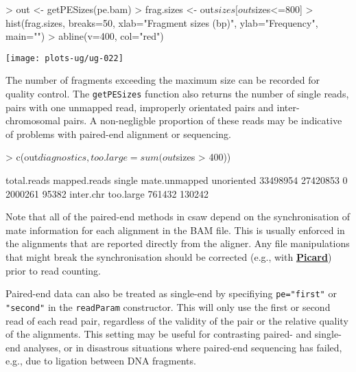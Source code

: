 \documentclass[12pt]{report}
\renewenvironment{Schunk}{\vspace{0pt}}{\vspace{0pt}}
\newcommand{\pkgname}{csaw}
\newcommand{\code}[1]{{\small\texttt{#1}}}
\begin{document}
\begin{Schunk}
\begin{Sinput}
> out <- getPESizes(pe.bam)
> frag.sizes <- out$sizes[out$sizes<=800]
> hist(frag.sizes, breaks=50, xlab="Fragment sizes (bp)", ylab="Frequency", main="")
> abline(v=400, col="red")
\end{Sinput}
\end{Schunk}

\begin{center}
\texttt{[image: plots-ug/ug-022]}
\end{center}

The number of fragments exceeding the maximum size can be recorded for quality control. 
The \code{getPESizes} function also returns the number of single reads, pairs with one unmapped read, improperly orientated pairs and inter-chromosomal pairs.
A non-negligble proportion of these reads may be indicative of problems with paired-end alignment or sequencing. 

\begin{Schunk}
\begin{Sinput}
> c(out$diagnostics, too.large=sum(out$sizes > 400))
\end{Sinput}
\begin{Soutput}
  total.reads  mapped.reads        single mate.unmapped    unoriented 
     33498954      27420853             0       2000261         95382 
    inter.chr     too.large 
       761432        130242 
\end{Soutput}
\end{Schunk}

Note that all of the paired-end methods in \pkgname{} depend on the synchronisation of mate information for each alignment in the BAM file. 
This is usually enforced in the alignments that are reported directly from the aligner. 
Any file manipulations that might break the synchronisation should be corrected (e.g., with \href{http://broadinstitute.github.io/picard}{\textbf{Picard}}) prior to read counting.

Paired-end data can also be treated as single-end by specifiying \code{pe="first"} or \code{"second"} in the \code{readParam} constructor. 
This will only use the first or second read of each read pair, regardless of the validity of the pair or the relative quality of the alignments.
This setting may be useful for contrasting paired- and single-end analyses, or in disastrous situations where paired-end sequencing has failed, e.g., due to ligation between DNA fragments.
\end{document}

